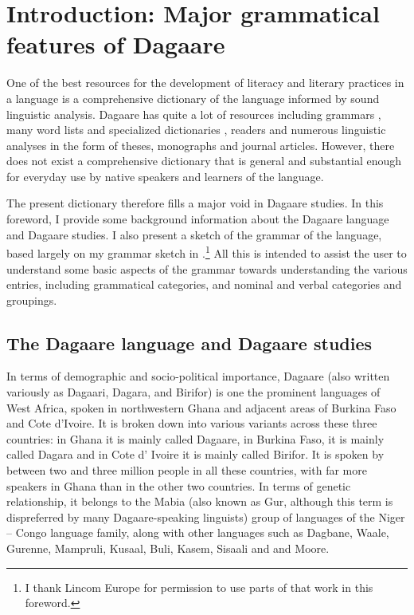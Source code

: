 \chapter{Introduction: Major grammatical features of Dagaare}

One of the best resources for the development of literacy and literary practices in a language is a comprehensive dictionary of the language informed by sound linguistic analysis. Dagaare has quite a lot of resources including grammars \citep{Bodomo1997, Bodomo2000, Dakubu2005}, many word lists and specialized dictionaries \citep{Durand1953, Bodomo2004}, readers \citep{Zakpaa1978} and numerous linguistic analyses in the form of theses, monographs and journal articles. However, there does not exist a comprehensive dictionary that is general and substantial enough for everyday use by native speakers and learners of the language.

The present dictionary therefore fills a major void in Dagaare studies. In this foreword, I provide some background information about the Dagaare language and Dagaare studies. I also present a sketch of the grammar of the language, based largely on my grammar sketch in \citet{Bodomo2000}.\footnote{I thank Lincom Europe for permission to use parts of that work in this foreword.} All this is intended to assist the user to understand some basic aspects of the grammar towards understanding the various entries, including grammatical categories, and nominal and verbal categories and groupings. 

\section{The Dagaare language and Dagaare studies}\label{sec:dagaarestudies}
In terms of demographic and socio-political importance, Dagaare (also written variously as Dagaari, Dagara, and Birifor) is one the prominent languages of West Africa, spoken in northwestern Ghana and adjacent areas of Burkina Faso and Cote d’Ivoire. It is broken down into various variants across these three countries: in Ghana it is mainly called Dagaare, in Burkina Faso, it is mainly called Dagara and in Cote d’ Ivoire it is mainly called Birifor. It is spoken by between two and three million people in all these countries, with far more speakers in Ghana than in the other two countries.
In terms of genetic relationship, it belongs to the Mabia (also known as Gur, although this term is dispreferred by many Dagaare-speaking linguists) group of languages of the Niger – Congo language family, along with other languages such as Dagbane, Waale, Gurenne, Mampruli, Kusaal, Buli, Kasem, Sisaali and and Moore.

